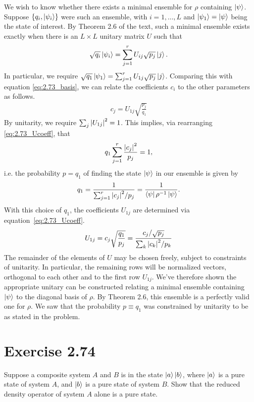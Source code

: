 \documentclass{book}
\begin{document}
    We wish to know whether there exists a minimal ensemble for $\rho$ containing $\ket{\psi}$. Suppose $\{q_i, \ket{\psi_i}\}$ were such an ensemble, with $i = 1, \dots, L$ and $\ket{\psi_1} = \ket{\psi}$ being the state of interest. By Theorem 2.6 of the text, such a minimal ensemble exists exactly when there is an $L\times L$ unitary matrix $U$ such that 
    \begin{align}
        \sqrt{q_i}\ket{\psi_i} = \sum_{j=1}^r U_{ij} \sqrt{p_j} \ket{j}.
    \end{align}
    In particular, we require $\sqrt{q_1} \ket{\psi_1} = \sum_{j=1}^r U_{1 j} \sqrt{p_j}\ket{j}$. Comparing this with equation \eqref{eq:2.73_basis}, we can relate the coefficients $c_i$ to the other parameters as follows.
    \begin{align} \label{eq:2.73_Ucoeff}
        c_j = U_{1j} \sqrt{\frac{p_j}{q_1}}
    \end{align}
    By unitarity, we require $\sum_j \abs{U_{1j}}^2 = 1$. This implies, via rearranging \eqref{eq:2.73_Ucoeff}, that
    \begin{align}
        q_1 \sum_{j=1}^r \frac{\abs{c_j}^2}{p_j} = 1,
    \end{align}
    i.e. the probability $p = q_1$ of finding the state $\ket{\psi}$ in our ensemble is given by
    \begin{align}
        q_1 = \frac{1}{\sum_{j=1}^r \abs{c_j}^2/p_j} = \frac{1}{\bra{\psi}\rho^{-1}\ket{\psi}}.
    \end{align}
    With this choice of $q_1$, the coefficients $U_{1j}$ are determined via equation~\eqref{eq:2.73_Ucoeff}. 
    \begin{align}
        U_{1j} = c_j \sqrt{\frac{q_1}{p_j}} = \frac{c_j/ \sqrt{p_j}}{\sum_{k} \abs{c_k}^2/p_k}
    \end{align}
    The remainder of the elements of $U$ may be chosen freely, subject to constraints of unitarity. In particular, the remaining rows will be normalized vectors, orthogonal to each other and to the first row $U_{1j}$. We've therefore shown the appropriate unitary can be constructed relating a minimal ensemble containing $\ket{\psi}$ to the diagonal basis of $\rho$. By Theorem 2.6, this ensemble is a perfectly valid one for $\rho$. We saw that the probability $p \equiv q_1$ was constrained by unitarity to be as stated in the problem. 

\section*{Exercise 2.74}
    Suppose a composite system $A$ and $B$ is in the state $\ket{a}\ket{b}$, where $\ket{a}$ is a pure state of system $A$, and $\ket{b}$ is a pure state of system $B$. Show that the reduced density operator of system $A$ alone is a pure state. 
\end{document}
